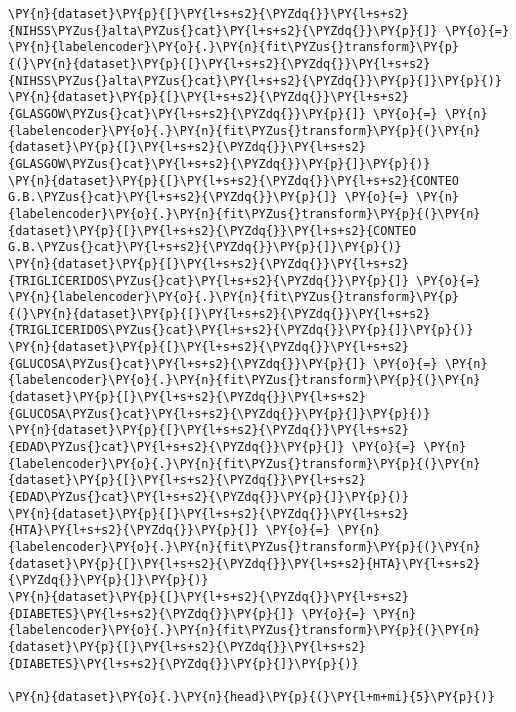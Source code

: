    \begin{tcolorbox}[breakable, size=fbox, boxrule=1pt, pad at break*=1mm,colback=cellbackground, colframe=cellborder]
\begin{Verbatim}[commandchars=\\\{\}]
\PY{n}{dataset}\PY{p}{[}\PY{l+s+s2}{\PYZdq{}}\PY{l+s+s2}{NIHSS\PYZus{}alta\PYZus{}cat}\PY{l+s+s2}{\PYZdq{}}\PY{p}{]} \PY{o}{=} \PY{n}{labelencoder}\PY{o}{.}\PY{n}{fit\PYZus{}transform}\PY{p}{(}\PY{n}{dataset}\PY{p}{[}\PY{l+s+s2}{\PYZdq{}}\PY{l+s+s2}{NIHSS\PYZus{}alta\PYZus{}cat}\PY{l+s+s2}{\PYZdq{}}\PY{p}{]}\PY{p}{)}
\PY{n}{dataset}\PY{p}{[}\PY{l+s+s2}{\PYZdq{}}\PY{l+s+s2}{GLASGOW\PYZus{}cat}\PY{l+s+s2}{\PYZdq{}}\PY{p}{]} \PY{o}{=} \PY{n}{labelencoder}\PY{o}{.}\PY{n}{fit\PYZus{}transform}\PY{p}{(}\PY{n}{dataset}\PY{p}{[}\PY{l+s+s2}{\PYZdq{}}\PY{l+s+s2}{GLASGOW\PYZus{}cat}\PY{l+s+s2}{\PYZdq{}}\PY{p}{]}\PY{p}{)}
\PY{n}{dataset}\PY{p}{[}\PY{l+s+s2}{\PYZdq{}}\PY{l+s+s2}{CONTEO G.B.\PYZus{}cat}\PY{l+s+s2}{\PYZdq{}}\PY{p}{]} \PY{o}{=} \PY{n}{labelencoder}\PY{o}{.}\PY{n}{fit\PYZus{}transform}\PY{p}{(}\PY{n}{dataset}\PY{p}{[}\PY{l+s+s2}{\PYZdq{}}\PY{l+s+s2}{CONTEO G.B.\PYZus{}cat}\PY{l+s+s2}{\PYZdq{}}\PY{p}{]}\PY{p}{)}
\PY{n}{dataset}\PY{p}{[}\PY{l+s+s2}{\PYZdq{}}\PY{l+s+s2}{TRIGLICERIDOS\PYZus{}cat}\PY{l+s+s2}{\PYZdq{}}\PY{p}{]} \PY{o}{=} \PY{n}{labelencoder}\PY{o}{.}\PY{n}{fit\PYZus{}transform}\PY{p}{(}\PY{n}{dataset}\PY{p}{[}\PY{l+s+s2}{\PYZdq{}}\PY{l+s+s2}{TRIGLICERIDOS\PYZus{}cat}\PY{l+s+s2}{\PYZdq{}}\PY{p}{]}\PY{p}{)}
\PY{n}{dataset}\PY{p}{[}\PY{l+s+s2}{\PYZdq{}}\PY{l+s+s2}{GLUCOSA\PYZus{}cat}\PY{l+s+s2}{\PYZdq{}}\PY{p}{]} \PY{o}{=} \PY{n}{labelencoder}\PY{o}{.}\PY{n}{fit\PYZus{}transform}\PY{p}{(}\PY{n}{dataset}\PY{p}{[}\PY{l+s+s2}{\PYZdq{}}\PY{l+s+s2}{GLUCOSA\PYZus{}cat}\PY{l+s+s2}{\PYZdq{}}\PY{p}{]}\PY{p}{)}
\PY{n}{dataset}\PY{p}{[}\PY{l+s+s2}{\PYZdq{}}\PY{l+s+s2}{EDAD\PYZus{}cat}\PY{l+s+s2}{\PYZdq{}}\PY{p}{]} \PY{o}{=} \PY{n}{labelencoder}\PY{o}{.}\PY{n}{fit\PYZus{}transform}\PY{p}{(}\PY{n}{dataset}\PY{p}{[}\PY{l+s+s2}{\PYZdq{}}\PY{l+s+s2}{EDAD\PYZus{}cat}\PY{l+s+s2}{\PYZdq{}}\PY{p}{]}\PY{p}{)}
\PY{n}{dataset}\PY{p}{[}\PY{l+s+s2}{\PYZdq{}}\PY{l+s+s2}{HTA}\PY{l+s+s2}{\PYZdq{}}\PY{p}{]} \PY{o}{=} \PY{n}{labelencoder}\PY{o}{.}\PY{n}{fit\PYZus{}transform}\PY{p}{(}\PY{n}{dataset}\PY{p}{[}\PY{l+s+s2}{\PYZdq{}}\PY{l+s+s2}{HTA}\PY{l+s+s2}{\PYZdq{}}\PY{p}{]}\PY{p}{)}
\PY{n}{dataset}\PY{p}{[}\PY{l+s+s2}{\PYZdq{}}\PY{l+s+s2}{DIABETES}\PY{l+s+s2}{\PYZdq{}}\PY{p}{]} \PY{o}{=} \PY{n}{labelencoder}\PY{o}{.}\PY{n}{fit\PYZus{}transform}\PY{p}{(}\PY{n}{dataset}\PY{p}{[}\PY{l+s+s2}{\PYZdq{}}\PY{l+s+s2}{DIABETES}\PY{l+s+s2}{\PYZdq{}}\PY{p}{]}\PY{p}{)}

\PY{n}{dataset}\PY{o}{.}\PY{n}{head}\PY{p}{(}\PY{l+m+mi}{5}\PY{p}{)}
\end{Verbatim}
\end{tcolorbox}

